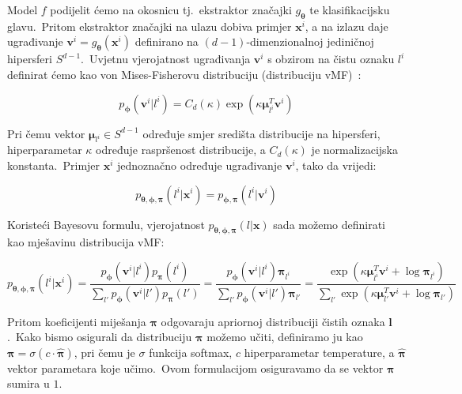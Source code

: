 \documentclass[diplomskirad]{fer}
\begin{document}
Model $f$ podijelit ćemo na okosnicu tj.\ ekstraktor značajki $g_{\bm{\theta}}$ te klasifikacijsku glavu.\ 
Pritom ekstraktor značajki na ulazu dobiva primjer $\bm{x}^i$, a na izlazu daje ugrađivanje $\bm{v}^i = g_{\bm{\theta}}(\bm{x}^i)$ definirano na $(d - 1)$-dimenzionalnoj jediničnoj hipersferi $S^{d - 1}$.\ 
Uvjetnu vjerojatnost ugrađivanja $\bm{v}^i$ s obzirom na čistu oznaku $l^i$ definirat ćemo kao von Mises-Fisherovu distribuciju (distribuciju vMF)~\cite{banerjee2005clustering}:

\begin{equation}
  p_{\bm{\phi}}(\bm{v}^i | l^i) = C_d(\kappa) \exp(\kappa \bm{\mu}_{l^i}^T \bm{v}^i)
  \label{eq:p_v_l}
\end{equation}

Pri čemu vektor $\bm{\mu}_{l^i} \in S^{d - 1}$ određuje smjer središta distribucije na hipersferi, hiperparametar $\kappa$ određuje raspršenost distribucije, a $C_d(\kappa)$ je normalizacijska konstanta.\ 
Primjer $\bm{x}^i$ jednoznačno određuje ugrađivanje $\bm{v}^i$, tako da vrijedi:

\begin{equation}
  p_{\bm{\theta}, \bm{\phi}, \bm{\pi}}(l^i | \bm{x}^i) = p_{\bm{\phi}, \bm{\pi}}(l^i | \bm{v}^i)
  \label{eq:v_eq_x}
\end{equation}

Koristeći Bayesovu formulu, vjerojatnost $p_{\bm{\theta}, \bm{\phi}, \bm{\pi}}(l | \bm{x})$ sada možemo definirati kao mješavinu distribucija vMF:

\begin{equation}
  p_{\bm{\theta}, \bm{\phi}, \bm{\pi}}(l^i | \bm{x}^i) = \frac{p_{\bm{\phi}}(\bm{v}^i | l^i) p_{\bm{\pi}}(l^i)}{\sum_{l'} p_{\bm{\phi}}(\bm{v}^i | l') p_{\bm{\pi}}(l')}
                                                       = \frac{p_{\bm{\phi}}(\bm{v}^i | l^i) \bm{\pi}_{l^i}}{\sum_{l'} p_{\bm{\phi}}(\bm{v}^i | l') \bm{\pi}_{l'}}
                                                       = \frac{\exp(\kappa \bm{\mu}_{l^i}^T \bm{v}^i + \log \bm{\pi}_{l^i})}{\sum_{l'} \exp(\kappa \bm{\mu}_{l'}^T \bm{v}^i + \log \bm{\pi}_{l'})}
  \label{eq:p_l_x}
\end{equation}

Pritom koeficijenti miješanja $\bm{\pi}$ odgovaraju apriornoj distribuciji čistih oznaka $\bm{l}$.\ 
Kako bismo osigurali da distribuciju $\bm{\pi}$ možemo učiti, definiramo ju kao $\bm{\pi} = \sigma (c \cdot \bm{\hat{\pi}})$, pri čemu je $\sigma$ funkcija softmax, $c$ hiperparametar temperature, a $\bm{\hat{\pi}}$ vektor parametara koje učimo.\ 
Ovom formulacijom osiguravamo da se vektor $\bm{\pi}$ sumira u $1$.\
\end{document}
